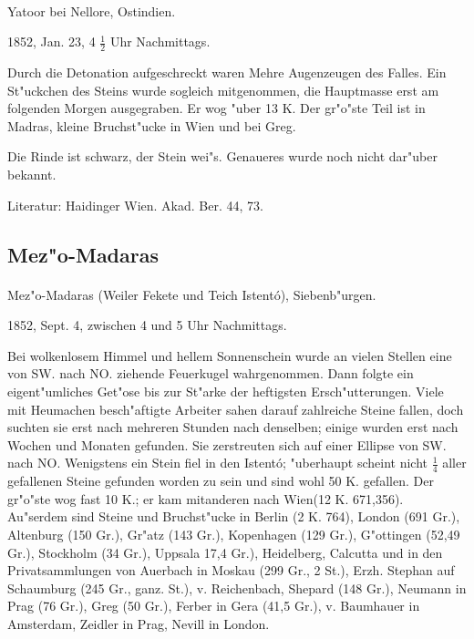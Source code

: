 \documentclass[a4paper, 11pt, oneside]{article}
\begin{document}
\paragraph{}
Yatoor bei Nellore, Ostindien.

1852, Jan. 23, 4 $\frac{1}{2}$ Uhr Nachmittags.

Durch die Detonation aufgeschreckt waren Mehre Augenzeugen des Falles. Ein St"uckchen des Steins wurde sogleich mitgenommen, die Hauptmasse erst am folgenden Morgen ausgegraben. Er wog "uber 13 K. Der gr"o"ste Teil ist in Madras, kleine Bruchst"ucke in Wien und bei Greg.

Die Rinde ist schwarz, der Stein wei"s. Genaueres wurde noch nicht dar"uber bekannt.

\footnotesize
Literatur: Haidinger Wien. Akad. Ber. 44, 73.

\subsection{Mez"o-Madaras}
\normalsize
\paragraph{}
Mez"o-Madaras (Weiler Fekete und Teich Istentó), Siebenb"urgen.

1852, Sept. 4, zwischen 4 und 5 Uhr Nachmittags.

Bei wolkenlosem Himmel und hellem Sonnenschein wurde an vielen Stellen eine von SW. nach NO. ziehende Feuerkugel wahrgenommen. Dann folgte ein eigent"umliches Get"ose bis zur St"arke der heftigsten Ersch"utterungen. Viele mit Heumachen besch"aftigte Arbeiter sahen darauf zahlreiche Steine fallen, doch suchten sie erst nach mehreren Stunden nach denselben; einige wurden erst nach Wochen und Monaten gefunden. Sie zerstreuten sich auf einer Ellipse von SW. nach NO. Wenigstens ein Stein fiel in den Istentó; "uberhaupt scheint nicht $\frac{1}{4}$ aller gefallenen Steine gefunden worden zu sein und sind wohl 50 K. gefallen. Der gr"o"ste wog fast 10 K.; er kam mitanderen nach Wien(12 K. 671,356). Au"serdem sind Steine und Bruchst"ucke in Berlin (2 K. 764), London (691 Gr.), Altenburg (150 Gr.), Gr"atz (143 Gr.), Kopenhagen (129 Gr.), G"ottingen (52,49 Gr.), Stockholm (34 Gr.), Uppsala 17,4 Gr.), Heidelberg, Calcutta und in den Privatsammlungen von Auerbach in Moskau (299 Gr., 2 St.), Erzh. Stephan auf Schaumburg (245 Gr., ganz. St.), v. Reichenbach, Shepard (148 Gr.), Neumann in Prag (76 Gr.), Greg (50 Gr.), Ferber in Gera (41,5 Gr.), v. Baumhauer in Amsterdam, Zeidler in Prag, Nevill in London.
\end{document}
